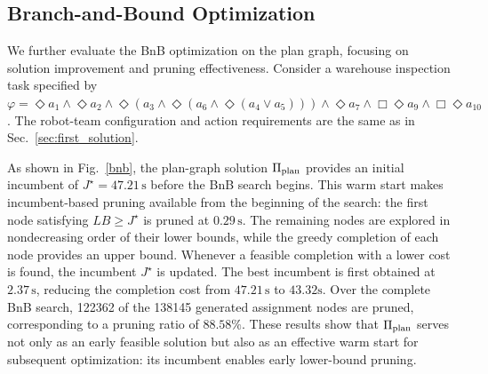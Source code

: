 \documentclass[lettersize,journal]{IEEEtran}
\theoremstyle{italiclemma}
\theoremstyle{italiclemma}
\theoremstyle{definition}
\begin{document}


\subsection{Branch-and-Bound Optimization} \label{bnb_exp}
We further evaluate the BnB optimization on the  plan graph, focusing on solution improvement and pruning effectiveness.
Consider a warehouse inspection task specified by $\varphi=\Diamond a_1\wedge\Diamond a_2\wedge \Diamond(a_3\wedge\Diamond(a_6\wedge\Diamond(a_4\vee a_5))) \wedge\Diamond a_7\wedge \Box\Diamond a_9\wedge \Box\Diamond a_{10}$. The robot-team configuration and action requirements are the same as in Sec.~\ref{sec:first_solution}.

As shown in Fig.~\ref{bnb}, the plan-graph solution $\Pi_{\rm plan}$ provides an initial incumbent of $J^\star=47.21\,\mathrm{s}$ before the BnB search begins. This warm start makes incumbent-based pruning available from the beginning of the search: the first node satisfying
$LB\geq J^\star$ is pruned at $0.29\,\mathrm{s}$. The remaining nodes are explored in nondecreasing order of their lower bounds, while the greedy completion of each node provides an upper bound. Whenever a feasible completion with a lower cost is found, the incumbent
$J^\star$ is updated.
The best incumbent is first obtained at $2.37\,\mathrm{s}$, reducing the completion cost from $47.21\,\mathrm{s}$ to $43.32 \mathrm{s}$. Over the complete BnB search, 122362 of the 138145 generated assignment nodes are pruned, corresponding to a pruning ratio of $88.58\%$. These results show that $\Pi_{\rm plan}$ serves not only as an early feasible solution but also as an effective warm start for subsequent optimization: its incumbent enables early lower-bound pruning.
\end{document}
